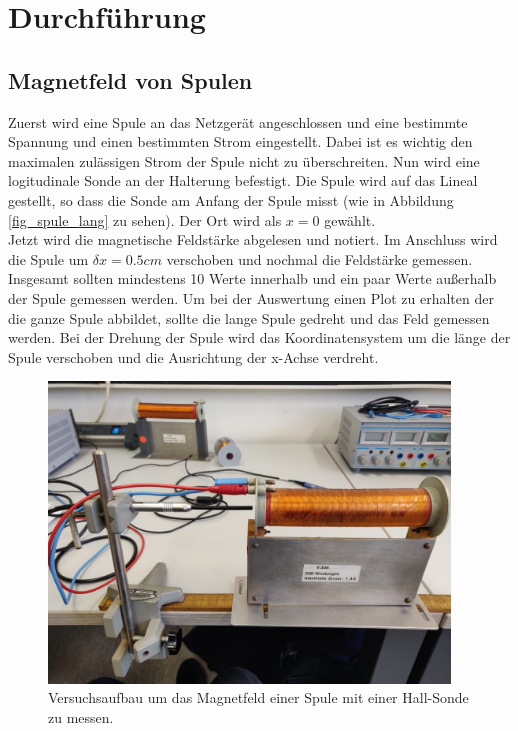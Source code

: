\section{Durchführung}
\label{sec:Durchführung}
\subsection{Magnetfeld von Spulen}
Zuerst wird eine Spule an das Netzgerät angeschlossen und eine bestimmte
Spannung und einen bestimmten Strom eingestellt. Dabei ist es wichtig den maximalen
zulässigen Strom der Spule nicht zu überschreiten.
Nun wird eine logitudinale Sonde an der Halterung befestigt. Die Spule wird auf das Lineal gestellt, so dass
die Sonde am Anfang der Spule misst (wie in Abbildung \ref{fig_spule_lang} zu sehen). Der Ort wird als $x=0$ gewählt.\\
Jetzt wird die magnetische Feldstärke abgelesen und notiert. Im Anschluss wird die Spule um $\delta x = 0.5 cm$ verschoben und
nochmal die Feldstärke gemessen. Insgesamt sollten mindestens 10 Werte innerhalb und ein paar Werte außerhalb der Spule gemessen werden.
Um bei der Auswertung einen Plot zu erhalten der die ganze Spule abbildet, sollte die lange Spule gedreht und das Feld gemessen werden.
Bei der Drehung der Spule wird das Koordinatensystem um die länge der Spule verschoben und die Ausrichtung der x-Achse verdreht.
\begin{figure}
    \centering
    \includegraphics[height=8cm]{content/spule_lang.jpg}
    \caption{Versuchsaufbau um das Magnetfeld einer Spule mit einer Hall-Sonde zu messen.}
    \label{fig:spule_lang}
\end{figure}

